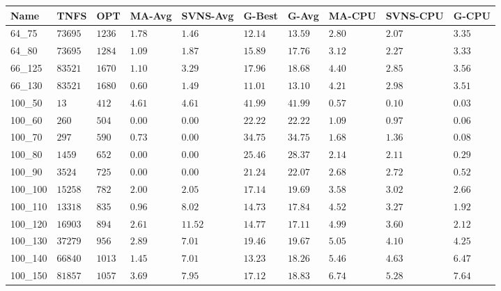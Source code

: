 \begin{center}
\begin{table}[]
\centering
\begin{tabular}{|lll|l|l|ll|lll|}
\hline
Name     & TNFS        & OPT    & MA-Avg & SVNS-Avg & G-Best & G-Avg & MA-CPU & SVNS-CPU & G-CPU \\
\hline
64\_75   & $73695   $  & $1236$ & $1.78$ & $1.46 $  & $12.14$    & $13.59$   & $2.80 $& $2.07$   & $3.35$ \\
64\_80   & $73695   $  & $1284$ & $1.09$ & $1.87 $  & $15.89$    & $17.76$   & $3.12 $& $2.27$   & $3.33$ \\
\hline
66\_125  & $83521   $  & $1670$ & $1.10$ & $3.29 $  & $17.96$    & $18.68$   & $4.40 $& $2.85$   & $3.56$ \\
66\_130  & $83521   $  & $1680$ & $0.60$ & $1.49 $  & $11.01$    & $13.10$   & $4.21 $& $2.98$   & $3.51$ \\
\hline
100\_50  & $13      $  & $412 $ & $4.61$ & $4.61 $  & $41.99$    & $41.99$   & $0.57 $& $0.10$   & $0.03$ \\
100\_60  & $260     $  & $504 $ & $\bm{0.00}$ & $\bm{0.00} $  & $22.22$    & $22.22$   & $1.09 $& $0.97$   & $0.06$ \\
100\_70  & $297     $  & $590 $ & $0.73$ & $\bm{0.00} $  & $34.75$    & $34.75$   & $1.68 $& $1.36$   & $0.08$ \\
100\_80  & $1459    $  & $652 $ & $\bm{0.00}$ & $\bm{0.00} $  & $25.46$    & $28.37$   & $2.14 $& $2.11$   & $0.29$ \\
100\_90  & $3524    $  & $725 $ & $\bm{0.00}$ & $\bm{0.00} $  & $21.24$    & $22.07$   & $2.68 $& $2.72$   & $0.52$ \\
100\_100 & $15258   $  & $782 $ & $2.00$ & $2.05 $  & $17.14$    & $19.69$   & $3.58 $& $3.02$   & $2.66$ \\
100\_110 & $13318   $  & $835 $ & $0.96$ & $8.02 $  & $14.73$    & $17.84$   & $4.52 $& $3.27$   & $1.92$ \\
100\_120 & $16903   $  & $894 $ & $2.61$ & $11.52$  & $14.77$    & $17.11$   & $4.99 $& $3.60$   & $2.12$ \\
100\_130 & $37279   $  & $956 $ & $2.89$ & $7.01 $  & $19.46$    & $19.67$   & $5.05 $& $4.10$   & $4.25$ \\
100\_140 & $66840   $  & $1013$ & $1.45$ & $7.01 $  & $13.23$    & $18.26$   & $5.46 $& $4.63$   & $6.47$ \\
100\_150 & $81857   $  & $1057$ & $3.69$ & $7.95 $  & $17.12$    & $18.83$   & $6.74 $& $5.28$   & $7.64$ \\

\end{tabular}
\end{table}
\end{center}
